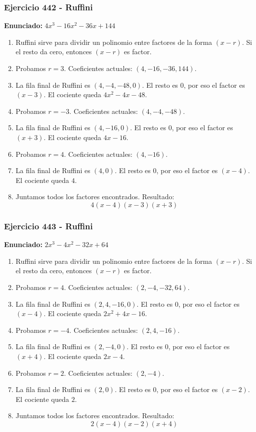 \documentclass[11pt,a4paper]{article}
\begin{document}
\subsubsection*{Ejercicio 442 - Ruffini}
\textbf{Enunciado:} $ 4 x^{3} - 16 x^{2} - 36 x + 144 $\par
\begin{enumerate}[leftmargin=2em]
\item Ruffini sirve para dividir un polinomio entre factores de la forma \((x-r)\). Si el resto da cero, entonces \((x-r)\) es factor.
\item Probamos \(r=3\). Coeficientes actuales: \((4, -16, -36, 144)\).
\item La fila final de Ruffini es \((4, -4, -48, 0)\). El resto es \(0\), por eso el factor es \((x-3)\). El cociente queda \(4 x^{2} - 4 x - 48\).
\item Probamos \(r=-3\). Coeficientes actuales: \((4, -4, -48)\).
\item La fila final de Ruffini es \((4, -16, 0)\). El resto es \(0\), por eso el factor es \((x+3)\). El cociente queda \(4 x - 16\).
\item Probamos \(r=4\). Coeficientes actuales: \((4, -16)\).
\item La fila final de Ruffini es \((4, 0)\). El resto es \(0\), por eso el factor es \((x-4)\). El cociente queda \(4\).
\item Juntamos todos los factores encontrados. Resultado: \[\boxed{4 \left(x - 4\right) \left(x - 3\right) \left(x + 3\right)}\]
\end{enumerate}

\vspace{0.2cm}
\subsubsection*{Ejercicio 443 - Ruffini}
\textbf{Enunciado:} $ 2 x^{3} - 4 x^{2} - 32 x + 64 $\par
\begin{enumerate}[leftmargin=2em]
\item Ruffini sirve para dividir un polinomio entre factores de la forma \((x-r)\). Si el resto da cero, entonces \((x-r)\) es factor.
\item Probamos \(r=4\). Coeficientes actuales: \((2, -4, -32, 64)\).
\item La fila final de Ruffini es \((2, 4, -16, 0)\). El resto es \(0\), por eso el factor es \((x-4)\). El cociente queda \(2 x^{2} + 4 x - 16\).
\item Probamos \(r=-4\). Coeficientes actuales: \((2, 4, -16)\).
\item La fila final de Ruffini es \((2, -4, 0)\). El resto es \(0\), por eso el factor es \((x+4)\). El cociente queda \(2 x - 4\).
\item Probamos \(r=2\). Coeficientes actuales: \((2, -4)\).
\item La fila final de Ruffini es \((2, 0)\). El resto es \(0\), por eso el factor es \((x-2)\). El cociente queda \(2\).
\item Juntamos todos los factores encontrados. Resultado: \[\boxed{2 \left(x - 4\right) \left(x - 2\right) \left(x + 4\right)}\]
\end{enumerate}
\end{document}
